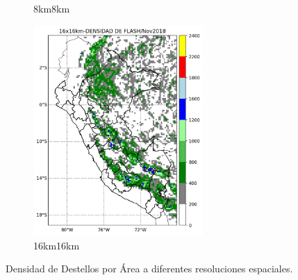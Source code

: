 \begin{figure}[H]
\begin{subfigure}{0.4\textwidth}
    \caption{8km\times 8km}
  \end{subfigure}\hfil
  \begin{subfigure}{0.4\textwidth}
    \includegraphics[height=8cm]{E_IMAGENES/5_Metodologia/fed_16_16}
    \caption{16km\times 16km}
  \end{subfigure}
  \caption[Densidad de Destellos por Área]{
    Densidad de Destellos por Área a diferentes resoluciones espaciales.
  }
  \label{fig:feds}
\end{figure}